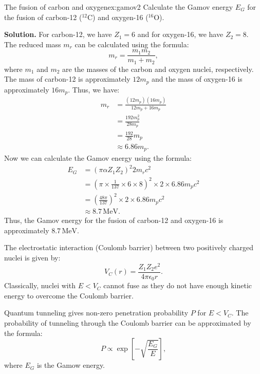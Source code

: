 \begin{example}{The fusion of carbon and oxygen}{ex:gamov2}
Calculate the Gamov energy $E_G$ for the fusion of carbon-12 ($^{12}\text{C}$) and oxygen-16 ($^{16}\text{O}$). 

\smallskip\textbf{Solution.}
For carbon-12, we have $Z_1 = 6$ and for oxygen-16, we have $Z_2 = 8$. The reduced mass $m_r$ can be calculated using the formula:
\begin{equation}
m_r = \frac{m_1 m_2}{m_1 + m_2},
\end{equation}
where $m_1$ and $m_2$ are the masses of the carbon and oxygen nuclei, respectively. The mass of carbon-12 is approximately $12 m_p$ and the mass of oxygen-16 is approximately $16 m_p$. Thus, we have:
\begin{align*}
m_r &= \frac{(12 m_p)(16 m_p)}{12 m_p + 16 m_p} \\
&= \frac{192 m_p^2}{28 m_p} \\        
&= \frac{192}{28} m_p \\
&\approx 6.86 m_p.
\end{align*}
Now we can calculate the Gamov energy using the formula:
\begin{align*}
E_G &= (\pi \alpha Z_1 Z_2)^2 2 m_{r}c^2 \\
&= (\pi \times \frac{1}{137} \times 6 \times 8)^2 \times 2 \times 6.86 m_p c^2 \\
&= \left(\frac{48\pi}{137}\right)^2 \times 2 \times 6.86 m_p c^2 \\
&\approx 8.7\,\text{MeV}. 
\end{align*}
Thus, the Gamov energy for the fusion of carbon-12 and oxygen-16 is approximately $8.7\,\text{MeV}$.
\end{example}


\begin{foundation}
The electrostatic interaction (Coulomb barrier) between two positively charged nuclei is given by:
\begin{equation}
V_C(r) = \frac{Z_1 Z_2 e^2}{4\pi \epsilon_0 r}.
\end{equation}
Classically, nuclei with $E<V_C$ cannot fuse as they do not have enough kinetic energy to overcome the Coulomb barrier.

Quantum tunneling gives non-zero penetration probability $P$ for $E<V_C$. The probability of tunneling through the Coulomb barrier can be approximated by the formula:
\begin{equation}
    P \propto \exp\left[-\sqrt{\frac{E_G}{E}}\right],
\end{equation}
where $E_G$ is the Gamow energy.
\end{foundation}

